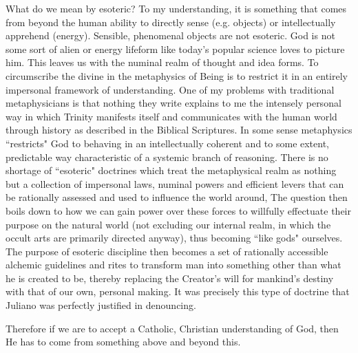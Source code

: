\begin{footnotesize}
\begin{sffamily}
What do we mean by esoteric? To my understanding, it is something that comes from beyond the human ability to directly sense (e.g. objects) or intellectually apprehend (energy). Sensible, phenomenal objects are not esoteric. God is not some sort of alien or energy lifeform like today's popular science loves to picture him. This leaves us with the numinal realm of thought and idea forms. To circumscribe the divine in the metaphysics of Being is to restrict it in an entirely impersonal framework of understanding. One of my problems with traditional metaphysicians is that nothing they write explains to me the intensely personal way in which Trinity manifests itself and communicates with the human world through history as described in the Biblical Scriptures. In some sense metaphysics ``restricts" God to behaving in an intellectually coherent and to some extent, predictable way characteristic of a systemic branch of reasoning. There is no shortage of ``esoteric" doctrines which treat the metaphysical realm as nothing but a collection of impersonal laws, numinal powers and efficient levers that can be rationally assessed and used to influence the world around, The question then boils down to how we can gain power over these forces to willfully effectuate their purpose on the natural world (not excluding our internal realm, in which the occult arts are primarily directed anyway), thus becoming ``like gods" ourselves. The purpose of esoteric discipline then becomes a set of rationally accessible alchemic guidelines and rites to transform man into something other than what he is created to be, thereby replacing the Creator's will for mankind's destiny with that of our own, personal making. It was precisely this type of doctrine that Juliano was perfectly justified in denouncing. 

Therefore if we are to accept a Catholic, Christian understanding of God, then He has to come from something above and beyond this. 


\end{sffamily}
\end{footnotesize}
